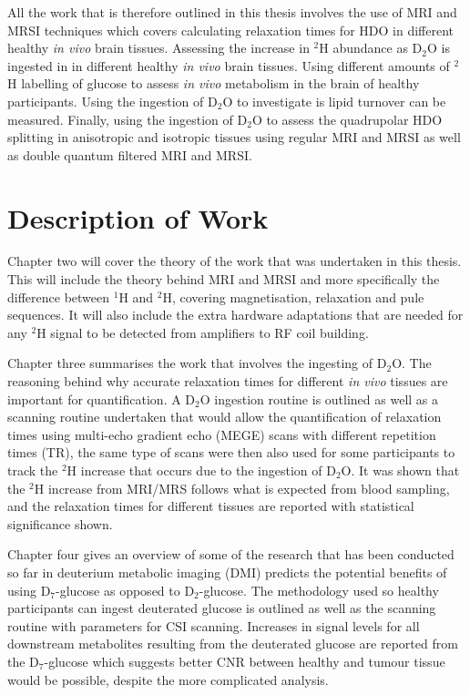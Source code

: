 \documentclass[class=article, crop=false]{standalone}
\begin{document}
All the work that is therefore outlined in this thesis involves the use of MRI and MRSI techniques which covers calculating relaxation times for HDO in different healthy \textit{in vivo} brain tissues. Assessing the increase in $^2$H abundance as D$_2$O is ingested in in different healthy \textit{in vivo} brain tissues. Using different amounts of $^2$H labelling of glucose to assess \textit{in vivo} metabolism in the brain of healthy participants. Using the ingestion of D$_2$O to investigate is lipid turnover can be measured. Finally, using the ingestion of D$_2$O to assess the quadrupolar HDO splitting in anisotropic and isotropic tissues using regular MRI and MRSI as well as double quantum filtered MRI and MRSI.

\section{Description of Work}

Chapter two will cover the theory of the work that was undertaken in this thesis. This will include the theory behind MRI and MRSI and more specifically the difference between $^1$H and $^2$H, covering magnetisation, relaxation and pule sequences. It will also include the extra hardware adaptations that are needed for any $^2$H signal to be detected from amplifiers to RF coil building.

Chapter three summarises the work that involves the ingesting of D$_2$O. The reasoning behind why accurate relaxation times for different \textit{in vivo} tissues are important for quantification. A D$_2$O ingestion routine is outlined as well as a scanning routine undertaken that would allow the quantification of relaxation times using multi-echo gradient echo (MEGE) scans with different repetition times (TR), the same type of scans were then also used for some participants to track the $^2$H increase that occurs due to the ingestion of D$_2$O. It was shown that the $^2$H increase from MRI/MRS follows what is expected from blood sampling, and the relaxation times for different tissues are reported with statistical significance shown.

Chapter four gives an overview of some of the research that has been conducted so far in deuterium metabolic imaging (DMI) predicts the potential benefits of using D$_7$-glucose as opposed to D$_2$-glucose. The methodology used so healthy participants can ingest deuterated glucose is outlined as well as the scanning routine with parameters for CSI scanning. Increases in signal levels for all downstream metabolites resulting from the deuterated glucose are reported from the D$_7$-glucose which suggests better CNR between healthy and tumour tissue would be possible, despite the more complicated analysis.
\end{document}
